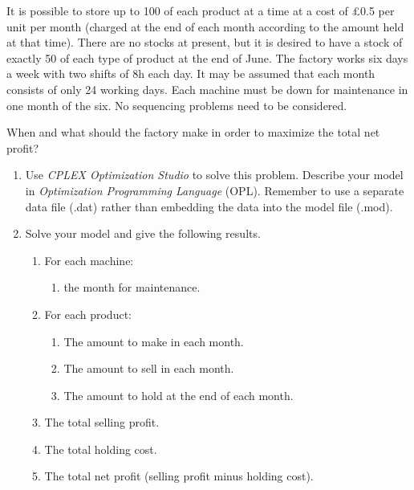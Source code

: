 \documentclass[12pt,a4paper]{article}
\theoremstyle{definition}
\begin{document}
\begin{enumerate}
	It is possible to store up to 100 of each product at a time at a cost of \pounds0.5 per unit per month (charged at the end of each month according to the amount held at that time). There are no stocks at present, but it is desired to have a stock of exactly 50 of each type of product at the end of June. The factory works six days a week with two shifts of 8h each day. It may be assumed that each month consists of only 24 working days. Each machine must be down for maintenance in one month of the six. No sequencing problems need to be considered.
	
	When and what should the factory make in order to maximize the total net profit?
	
	\begin{enumerate}
		\item
		Use \emph{CPLEX Optimization Studio} to solve this problem. Describe your model in \emph{Optimization Programming Language} (OPL). Remember to use a separate data file (.dat) rather than embedding the data into the model file (.mod).
		
		\item
		Solve your model and give the following results.
		\begin{enumerate}
			\item
			For each machine:
			\begin{enumerate}
				\item
				the month for maintenance.
			\end{enumerate}
			\item
			For each product:
			\begin{enumerate}
				\item
				The amount to make in each month.
				\item
				The amount to sell in each month.
				\item
				The amount to hold at the end of each month.
			\end{enumerate}
			\item
			The total selling profit.
			\item
			The total holding cost.
			\item
			The total net profit (selling profit minus holding cost).
		\end{enumerate}
	\end{enumerate}
	
\end{enumerate}
\end{document}
